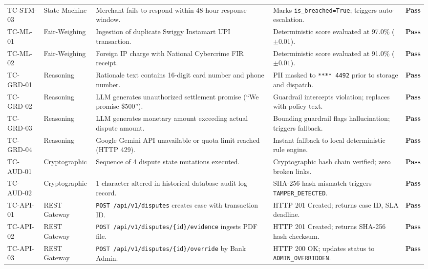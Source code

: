 \documentclass[11pt,a4paper]{article}
\begin{document}
\begin{longtable}{p{2.0cm} p{2.8cm} p{4.2cm} p{4.2cm} c}
TC-STM-03 & State Machine & Merchant fails to respond within 48-hour response window. & Marks \texttt{is\_breached=True}; triggers auto-escalation. & \textbf{Pass} \\

TC-ML-01 & Fair-Weighing & Ingestion of duplicate Swiggy Instamart UPI transaction. & Deterministic score evaluated at 97.0\% ($\pm 0.01$). & \textbf{Pass} \\

TC-ML-02 & Fair-Weighing & Foreign IP charge with National Cybercrime FIR receipt. & Deterministic score evaluated at 91.0\% ($\pm 0.01$). & \textbf{Pass} \\

TC-GRD-01 & Reasoning & Rationale text contains 16-digit card number and phone number. & PII masked to \texttt{**** 4492} prior to storage and dispatch. & \textbf{Pass} \\

TC-GRD-02 & Reasoning & LLM generates unauthorized settlement promise (``We promise \$500''). & Guardrail intercepts violation; replaces with policy text. & \textbf{Pass} \\

TC-GRD-03 & Reasoning & LLM generates monetary amount exceeding actual dispute amount. & Bounding guardrail flags hallucination; triggers fallback. & \textbf{Pass} \\

TC-GRD-04 & Reasoning & Google Gemini API unavailable or quota limit reached (HTTP 429). & Instant fallback to local deterministic rule engine. & \textbf{Pass} \\

TC-AUD-01 & Cryptographic & Sequence of 4 dispute state mutations executed. & Cryptographic hash chain verified; zero broken links. & \textbf{Pass} \\

TC-AUD-02 & Cryptographic & 1 character altered in historical database audit log record. & SHA-256 hash mismatch triggers \texttt{TAMPER\_DETECTED}. & \textbf{Pass} \\

TC-API-01 & REST Gateway & \texttt{POST /api/v1/disputes} creates case with transaction ID. & HTTP 201 Created; returns case ID, SLA deadline. & \textbf{Pass} \\

TC-API-02 & REST Gateway & \texttt{POST /api/v1/disputes/\{id\}/evidence} ingests PDF file. & HTTP 201 Created; returns SHA-256 hash checksum. & \textbf{Pass} \\

TC-API-03 & REST Gateway & \texttt{POST /api/v1/disputes/\{id\}/override} by Bank Admin. & HTTP 200 OK; updates status to \texttt{ADMIN\_OVERRIDDEN}. & \textbf{Pass} \\

\bottomrule
\end{longtable}
\end{document}
